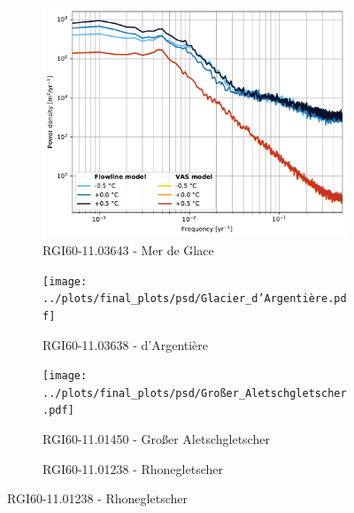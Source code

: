 \begin{figure}[htp]
\begin{subfigure}[b]{0.48\textwidth}
        \end{subfigure}
        \begin{subfigure}[b]{0.48\textwidth}
          \caption{RGI60-11.03643 - Mer de Glace}
          \label{fig:psd:mer_de_glace}
          \centering
          \includegraphics[width=\textwidth]{../plots/final_plots/psd/Mer_de_Glace.pdf}
        \end{subfigure}
        \hfill
        \begin{subfigure}[b]{0.48\textwidth}
          \caption{RGI60-11.03638 - d'Argentière}
          \label{fig:psd:glacier_d_argentiere}
          \centering
          \texttt{[image: ../plots/final\_plots/psd/Glacier\_d'Argentière.pdf]}
        \end{subfigure}
        \begin{subfigure}[b]{0.48\textwidth}
          \caption{RGI60-11.01450 - Großer Aletschgletscher}
          \label{fig:psd:großer_aletschgletscher}
          \centering
          \texttt{[image: ../plots/final\_plots/psd/Großer\_Aletschgletscher.pdf]}
        \end{subfigure}
        \hfill
        \begin{subfigure}[b]{0.48\textwidth}
          \caption{RGI60-11.01238 - Rhonegletscher}
          \label{fig:psd:rhonegletscher}
          \centering

\end{subfigure}
\end{figure}
